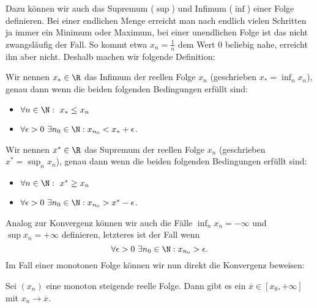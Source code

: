 \documentclass[letterpaper,10pt,english]{jupyterBook}
\begin{document}
Dazu können wir auch das Supremum (\(\sup\)) und Infimum (\(\inf\)) einer Folge definieren. Bei einer endlichen Menge erreicht man nach endlich vielen Schritten ja immer ein Minimum oder Maximum, bei einer unendlichen Folge ist das nicht zwangsläufig der Fall. So kommt etwa \(x_n = \frac{1}n\) dem Wert \(0\) beliebig nahe, erreicht ihn aber nicht. Deshalb machen wir folgende Definition:
\label{vorkurs/folgen:definition-7}
\begin{definition}{}{}



Wir nennen \(x_* \in \R\) das Infimum der reellen Folge \(x_n\) (geschrieben \(x_* = \inf_n x_n\)), genau dann wenn die beiden folgenden Bedingungen erfüllt sind:
\begin{itemize}
\item {} 
\(\forall n \in \N:~x_* \leq x_n\)

\item {} 
\(\forall \epsilon > 0~\exists n_0 \in \N: x_{n_0} < x_* + \epsilon\).

\end{itemize}

Wir nennen \(x^* \in \R\) das Supremum der reellen Folge \(x_n\) (geschrieben \(x^* = \sup_n x_n\)), genau dann wenn die beiden folgenden Bedingungen erfüllt sind:
\begin{itemize}
\item {} 
\(\forall n \in \N:~x^* \geq x_n\)

\item {} 
\(\forall \epsilon > 0~\exists n_0 \in \N: x_{n_0} > x^* -\epsilon\).

\end{itemize}
\end{definition}

Analog zur Konvergenz können wir auch die Fälle \(\inf_n x_n = - \infty\) und \(\sup x_n = +\infty\) definieren, letzteres ist der Fall wenn
\begin{equation*}
 \forall \epsilon > 0~\exists n_0 \in \N: x_{n_0} > \epsilon .\end{equation*}
Im Fall einer monotonen Folge können wir nun direkt die Konvergenz beweisen:
\label{vorkurs/folgen:theorem-8}
\begin{theorem}{}{}



Sei \((x_n)\) eine monoton steigende reelle Folge. Dann gibt es ein \(\overline{x} \in [x_0,+\infty]\) mit \(x_n \rightarrow \overline{x}\).
\end{theorem}
\end{document}
